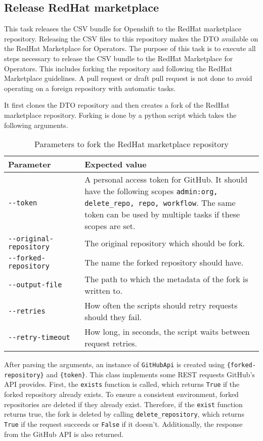 \subsection{Release RedHat marketplace}\label{subsec:release-redhat-marketplace}

This task releases the CSV bundle for Openshift to the RedHat marketplace repository.
Releasing the CSV files to this repository makes the DTO available on the RedHat Marketplace for Operators.
The purpose of this task is to execute all steps necessary to release the CSV bundle to the RedHat Marketplace for Operators.
This includes forking the repository and following the RedHat Marketplace guidelines.
A pull request or draft pull request is not done to avoid operating on a foreign repository with automatic tasks.

It first clones the DTO repository and then creates a fork of the RedHat marketplace repository.
Forking is done by a python script which takes the following arguments.

\begin{table}
    \centering
    \caption{Parameters to fork the RedHat marketplace repository}
    \label{tab:parameters-to-fork-the-redhat-marketplace-repository}
    \begin{tabular}{|p{0.3\linewidth}|p{0.7\linewidth}|}
        Parameter & Expected value \\
        \hline
        \verb|--token| & A personal access token for GitHub.
            It should have the following scopes \verb|admin:org, delete_repo, repo, workflow|.
            The same token can be used by multiple tasks if these scopes are set. \\
        \verb|--original-repository| & The original repository which should be fork. \\
        \verb|--forked-repository| & The name the forked repository should have. \\
        \verb|--output-file| & The path to which the metadata of the fork is written to. \\
        \verb|--retries| & How often the scripts should retry requests should they fail. \\
        \verb|--retry-timeout| & How long, in seconds, the script waits between request retries. \\
    \end{tabular}
\end{table}

After parsing the arguments, an instance of \verb|GitHubApi| is created using \verb|{forked-repository}| and \verb|{token}|.
This class implements some REST requests GitHub's API provides.
First, the \verb|exists| function is called, which returns \verb|True| if the forked repository already exists.
To ensure a consistent environment, forked repositories are deleted if they already exist.
Therefore, if the \verb|exist| function returns true, the fork is deleted by calling \verb|delete_repository|, which returns \verb|True| if the request succeeds or \verb|False| if it doesn't.
Additionally, the response from the GitHub API is also returned.

